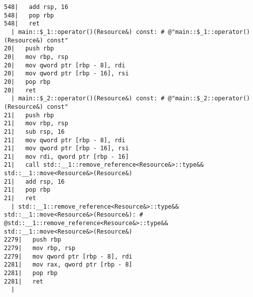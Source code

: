 \begin{lstlisting}[language={},numbers=none,title=\href{https://godbolt.org/z/hwKje8}{\texttt{godbolt.org/z/hwKje8}}]
548|   add rsp, 16
548|   pop rbp
548|   ret
  | main::$_1::operator()(Resource&) const: # @"main::$_1::operator()(Resource&) const"
20|   push rbp
20|   mov rbp, rsp
20|   mov qword ptr [rbp - 8], rdi
20|   mov qword ptr [rbp - 16], rsi
20|   pop rbp
20|   ret
  | main::$_2::operator()(Resource&) const: # @"main::$_2::operator()(Resource&) const"
21|   push rbp
21|   mov rbp, rsp
21|   sub rsp, 16
21|   mov qword ptr [rbp - 8], rdi
21|   mov qword ptr [rbp - 16], rsi
21|   mov rdi, qword ptr [rbp - 16]
21|   call std::__1::remove_reference<Resource&>::type&& std::__1::move<Resource&>(Resource&)
21|   add rsp, 16
21|   pop rbp
21|   ret
  | std::__1::remove_reference<Resource&>::type&& std::__1::move<Resource&>(Resource&): # @std::__1::remove_reference<Resource&>::type&& std::__1::move<Resource&>(Resource&)
2279|   push rbp
2279|   mov rbp, rsp
2279|   mov qword ptr [rbp - 8], rdi
2281|   mov rax, qword ptr [rbp - 8]
2281|   pop rbp
2281|   ret
  |
\end{lstlisting}
